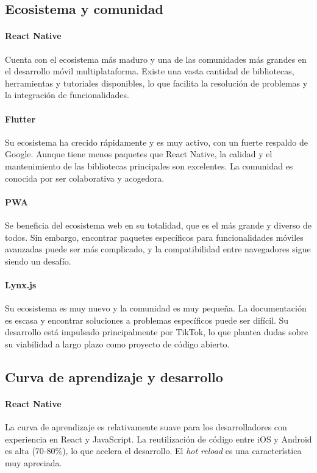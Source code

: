 \subsection{Ecosistema y comunidad}

\paragraph{React Native}
Cuenta con el ecosistema más maduro y una de las comunidades más grandes en el desarrollo móvil multiplataforma. Existe una vasta cantidad de bibliotecas, herramientas y tutoriales disponibles, lo que facilita la resolución de problemas y la integración de funcionalidades.

\paragraph{Flutter}
Su ecosistema ha crecido rápidamente y es muy activo, con un fuerte respaldo de Google. Aunque tiene menos paquetes que React Native, la calidad y el mantenimiento de las bibliotecas principales son excelentes. La comunidad es conocida por ser colaborativa y acogedora.

\paragraph{PWA}
Se beneficia del ecosistema web en su totalidad, que es el más grande y diverso de todos. Sin embargo, encontrar paquetes específicos para funcionalidades móviles avanzadas puede ser más complicado, y la compatibilidad entre navegadores sigue siendo un desafío.

\paragraph{Lynx.js}
Su ecosistema es muy nuevo y la comunidad es muy pequeña. La documentación es escasa y encontrar soluciones a problemas específicos puede ser difícil. Su desarrollo está impulsado principalmente por TikTok, lo que plantea dudas sobre su viabilidad a largo plazo como proyecto de código abierto.

\subsection{Curva de aprendizaje y desarrollo}

\paragraph{React Native}
La curva de aprendizaje es relativamente suave para los desarrolladores con experiencia en React y JavaScript. La reutilización de código entre iOS y Android es alta (70-80\%), lo que acelera el desarrollo. El \textit{hot reload} es una característica muy apreciada.

